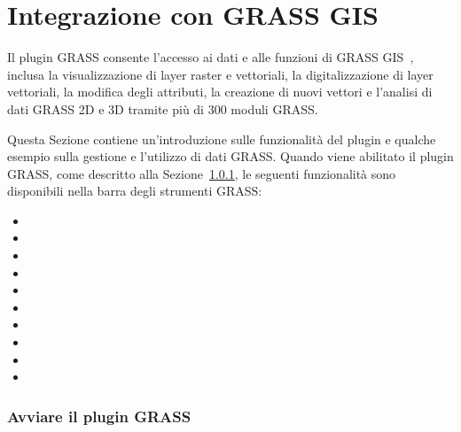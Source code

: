 
\chapter{Integrazione con GRASS GIS}\label{sec:grass}


Il plugin GRASS consente l'accesso ai dati e alle funzioni di GRASS
GIS~\cite{GRASSweb}, inclusa la visualizzazione di layer raster e vettoriali,
la digitalizzazione di layer vettoriali, la modifica degli attributi, la
creazione di nuovi vettori e l'analisi di dati GRASS 2D e 3D tramite più di
300 moduli GRASS.

Questa Sezione contiene un'introduzione sulle funzionalità del plugin
e qualche esempio sulla gestione e l'utilizzo di dati GRASS. Quando viene
abilitato il plugin GRASS, come descritto alla Sezione~\ref{sec:starting_grass},
le seguenti funzionalità sono disponibili nella barra degli strumenti GRASS:
 
\begin{itemize}[label=--]
\item {}
\item {}
\item {}
\item {}
\item {}
\item {}
\item {}
\item {}
\item {} 
\item {}
\end{itemize}

\subsection{Avviare il plugin GRASS}\label{sec:starting_grass}

